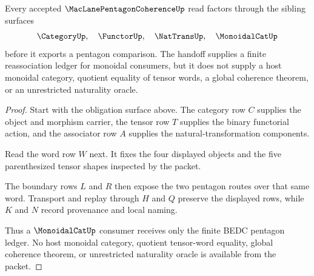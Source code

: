 \begin{theorem}
\label{thm:maclane-pentagon-coherence-sibling-handoff}
Every accepted $\MacLanePentagonCoherenceUp$ read factors through the sibling surfaces
$$
\CategoryUp,\quad \FunctorUp,\quad \NatTransUp,\quad \MonoidalCatUp
$$
before it exports a pentagon comparison. The handoff supplies a finite reassociation ledger for monoidal consumers, but it does not supply a host monoidal category, quotient equality of tensor words, a global coherence theorem, or an unrestricted naturality oracle.
\end{theorem}
\begin{proof}
Start with the obligation surface above. The category row $C$ supplies the object and morphism carrier, the tensor row $T$ supplies the binary functorial action, and the associator row $A$ supplies the natural-transformation components.

Read the word row $W$ next. It fixes the four displayed objects and the five parenthesized tensor shapes inspected by the packet.

The boundary rows $L$ and $R$ then expose the two pentagon routes over that same word. Transport and replay through $H$ and $Q$ preserve the displayed rows, while $K$ and $N$ record provenance and local naming.

Thus a $\MonoidalCatUp$ consumer receives only the finite BEDC pentagon ledger. No host monoidal category, quotient tensor-word equality, global coherence theorem, or unrestricted naturality oracle is available from the packet.
\end{proof}




